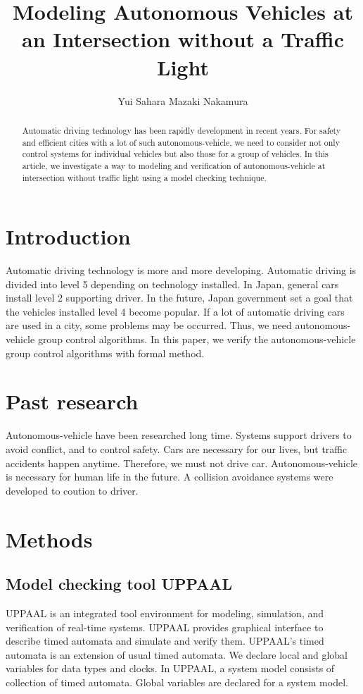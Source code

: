 \documentclass[]{article}
\title{Modeling Autonomous Vehicles at an Intersection without a Traffic Light}
\author{Yui Sahara Mazaki Nakamura}
\date{}
\begin{document}
\maketitle
\begin{abstract}
	Automatic driving technology has been rapidly development in recent years.  For safety and efficient cities with a lot of such autonomous-vehicle, we need to consider not only control systems for individual vehicles but also those for a group of vehicles.  In this article, we investigate a way to modeling and verification of autonomous-vehicle at intersection without traffic light using a model checking technique.
\end{abstract}

\section{Introduction}
	  Automatic driving technology is more and more developing.  Automatic driving is divided into level  5 depending on technology installed.  In Japan, general cars install level 2 supporting driver.  In the future,  Japan government set a goal that the vehicles installed level 4 become popular.  If a lot of automatic driving cars are used in a city, some problems may be occurred.  Thus, we need autonomous-vehicle group control algorithms.  In this paper, we verify the autonomous-vehicle group control algorithms with formal method.
\section{Past research}
	Autonomous-vehicle have been researched long time.  Systems support drivers to avoid conflict, and to control safety.  Cars are necessary for our lives, but traffic accidents happen anytime.  Therefore, we must not drive car.  Autonomous-vehicle is necessary for human life in the future.  A collision avoidance systems were developed to coution to driver.   
\section{Methods}
	\subsection{Model checking tool UPPAAL}
		UPPAAL is an integrated tool environment for modeling, simulation, and verification of real-time systems.  UPPAAL provides graphical interface to describe timed automata and simulate and verify them. UPPAAL's timed automata is an extension of usual timed automata.  We declare local and global variables for data types and clocks. In UPPAAL, a system model consists of collection of timed automata.  Global variables are declared for a system model.  
\end{document}
